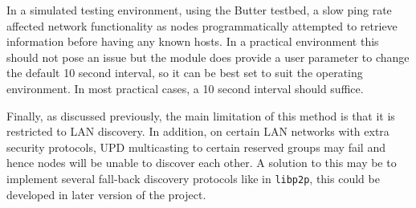 In a simulated testing environment, using the Butter testbed, a slow ping rate affected network functionality as nodes programmatically attempted to retrieve information before having any known hosts. In a practical environment this should not pose an issue but the module does provide a user parameter to change the default 10 second interval, so it can be best set to suit the operating environment. In most practical cases, a 10 second interval should suffice.

Finally, as discussed previously, the main limitation of this method is that it is restricted to LAN discovery. In addition, on certain LAN networks with extra security protocols, UPD multicasting to certain reserved groups may fail and hence nodes will be unable to discover each other. A solution to this may be to implement several fall-back discovery protocols like in \verb+libp2p+, this could be developed in later version of the project.